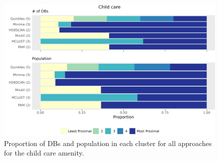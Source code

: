 \documentclass[11pt, a4paper]{article}
\begin{document}
\begin{figure}[H]
\centering
\includegraphics[width=\textwidth]{./barplot_comparison/Child care_barplot.png}
\caption[Child care profile barplot]{Proportion of DBs and population in each cluster for all approaches for the child care amenity.}\label{childcarebarplot}
\end{figure}




\centering
\begin{table}[H]
\centering
\caption[Child care validation metrics]{The validation metric values for each clustering approach for the child care amenity.}\label{childcarevalid}
\end{table}
\end{document}
